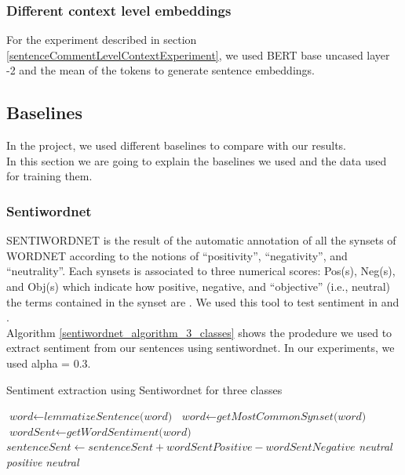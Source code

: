 \subsubsection{Different context level embeddings}
 \label{contexLeveLEmbeddings}
For the experiment described in section \ref{sentenceCommentLevelContextExperiment}, we used BERT base uncased layer -2 and the mean of the tokens to generate sentence embeddings.
\subsection{Baselines}
In the project, we used different baselines to compare with our results.\\
In this section we are going to explain the baselines we used and the data used for training them.
\subsubsection{Sentiwordnet}
SENTIWORDNET is the result of the automatic annotation of all the synsets of WORDNET according to the notions of “positivity”, “negativity”, and “neutrality”. Each synsets is  associated  to  three numerical  scores: Pos(s), Neg(s), and Obj(s) which  indicate  how  positive, negative, and “objective” (i.e., neutral) the terms contained in the synset are \cite{sentiWordnet}. We used this tool to test sentiment in {\dataEN} and {\dataORG}.\\
Algorithm \ref{sentiwordnet_algorithm_3_classes} shows the prodedure we used to extract sentiment from our sentences using sentiwordnet. In our experiments, we used alpha = 0.3.
\begin{algorithm}[H]
\caption{Sentiment extraction using Sentiwordnet for three classes}\label{euclid}
\label{sentiwordnet_algorithm_3_classes}
\begin{algorithmic}[1]
\State $\textit{word} \gets \textit{lemmatizeSentence(word)}$
\State $\textit{word} \gets \textit{getMostCommonSynset(word)}$
\State $\textit{wordSent} \gets \textit{getWordSentiment(word)}$
\State $\textit{sentenceSent} \gets \textit{sentenceSent} + \textit{wordSentPositive} - \textit{wordSentNegative}$
\EndFor
{}
    \Return \textit{neutral}
    \Return \textit{positive}
\Else
    \Return \textit{neutral}
\EndIf
\EndProcedure
\end{algorithmic}
\end{algorithm}
